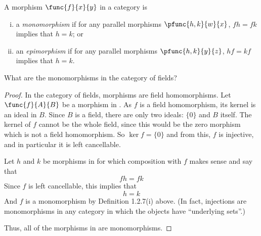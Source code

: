 \documentclass[main.tex]{subfiles}
\begin{document}
\begin{definition}
	A morphism \(\func{f}{x}{y}\) in a category is
	\begin{enumerate}[(i)]
		\item a \emph{monomorphism} if for any parallel morphisms
		\(\pfunc{h,k}{w}{x}\), \(fh=fk\) implies that \(h=k\); or
		\item an \emph{epimorphism} if for any parallel morphisms
		\(\pfunc{h,k}{y}{z}\), \(hf=kf\) implies that \(h=k\).
	\end{enumerate}
\end{definition}

\begin{exercise}
	What are the monomorphisms in the category of fields?
\end{exercise}
\begin{proof}
In the category of fields, morphisms are field homomorphisms. Let
\(\func{f}{A}{B}\) be a morphism in \Field. As \(f\) is a field homomorphism,
its kernel is an ideal in \(B\). Since \(B\) is a field, there are only two
ideals: \(\{0\}\) and \(B\) itself. The kernel of \(f\) cannot be the whole
field, since this would be the zero morphism which is not a field homomorphism.
So \(\ker f = \{0\}\) and from this, \(f\) is injective, and in particular it is
left cancellable.

Let \(h\) and \(k\) be morphisms in \Field for which composition with \(f\)
makes sense and say that \[fh = fk\] Since \(f\) is left cancellable, this
implies that \[h = k\] And \(f\) is a monomorphism by Definition 1.2.7(i) above.
(In fact, injections are monomorphisms in any category in which the objects have
``underlying sets''.)

Thus, all of the morphisms in \Field are monomorphisms.
\end{proof}
\end{document}
